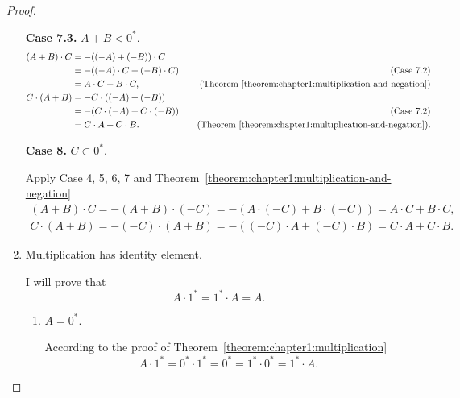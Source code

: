\begin{proof}
\begin{enumerate}[label={(F\arabic*)}, start=5]
              \textbf{Case 7.3.} $A + B < {0}^{*}$.
              \begin{align*}
                  (A + B)\cdot C & = -((-A) + (-B))\cdot C                                                                                    \\
                                 & = -((-A)\cdot C + (-B)\cdot C) & \quad\text{(Case 7.2)}                                                    \\
                                 & = A\cdot C + B\cdot C,         & \quad\text{(Theorem~\ref{theorem:chapter1:multiplication-and-negation})}  \\
                  C\cdot (A + B) & = -C\cdot ((-A) + (-B))                                                                                    \\
                                 & = -(C\cdot (-A) + C\cdot (-B)) & \quad\text{(Case 7.2)}                                                    \\
                                 & = C\cdot A + C\cdot B.         & \quad\text{(Theorem~\ref{theorem:chapter1:multiplication-and-negation})}.
              \end{align*}

              \textbf{Case 8.} $C\subset {0}^{*}$.

              Apply Case 4, 5, 6, 7 and Theorem~\ref{theorem:chapter1:multiplication-and-negation}
              \[
                  \begin{split}
                      (A + B)\cdot C = -(A + B)\cdot (-C) = -(A\cdot (-C) + B\cdot (-C)) = A\cdot C + B\cdot C, \\
                      C\cdot (A + B) = -(-C)\cdot (A + B) = -((-C)\cdot A + (-C)\cdot B) = C\cdot A + C\cdot B.
                  \end{split}
              \]
        \item Multiplication has identity element.

              I will prove that
              \[
                  A\cdot {1}^{*} = {1}^{*}\cdot A = A.
              \]

              \begin{enumerate}[label={\textbf{Case \arabic*.}}]
                  \item $A = {0}^{*}$.

                        According to the proof of Theorem~\ref{theorem:chapter1:multiplication}
                        \[
                            A\cdot {1}^{*} = {0}^{*}\cdot {1}^{*} = {0}^{*} = {1}^{*}\cdot {0}^{*} = {1}^{*}\cdot A.
                        \]


\end{enumerate}
\end{enumerate}
\end{proof}
